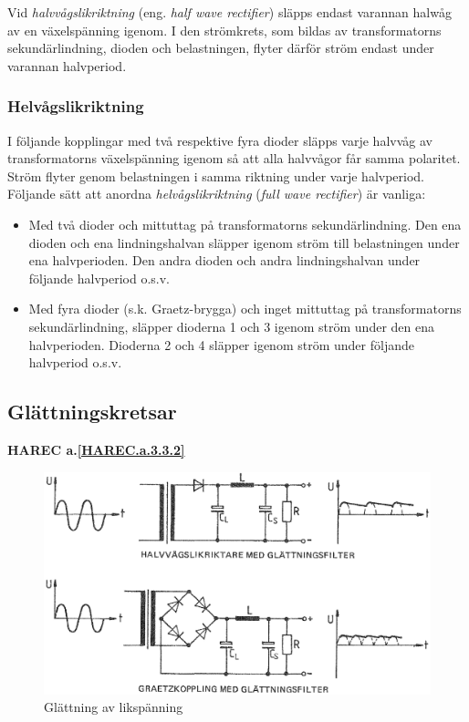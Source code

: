 Vid \emph{halvvågslikriktning} (eng. \emph{half wave rectifier}) släpps endast
varannan halwåg av en växelspänning igenom. I den strömkrets, som bildas av
transformatorns sekundärlindning, dioden och belastningen, flyter därför ström
endast under varannan halvperiod.

\subsubsection{Helvågslikriktning}

I följande kopplingar med två respektive fyra dioder släpps varje
halvvåg av transformatorns växelspänning igenom så att alla halvvågor
får samma polaritet. Ström flyter genom belastningen i samma riktning
under varje halvperiod. Följande sätt att anordna \emph{helvågslikriktning}
(\emph{full wave rectifier}) är vanliga:
\begin{itemize}
\item Med två dioder och mittuttag på transformatorns
  sekundärlindning. Den ena dioden och ena lindningshalvan släpper
  igenom ström till belastningen under ena halvperioden. Den andra
  dioden och andra lindningshalvan under följande halvperiod o.s.v.

\item Med fyra dioder (s.k. Graetz-brygga) och inget mittuttag på
  transformatorns sekundärlindning, släpper dioderna 1 och 3 igenom
  ström under den ena halvperioden.  Dioderna 2 och 4 släpper igenom
  ström under följande halvperiod o.s.v.
\end{itemize}

\subsection{Glättningskretsar}
\textbf{HAREC a.\ref{HAREC.a.3.3.2}\label{myHAREC.a.3.3.2}}

\begin{figure}
\includegraphics[width=\textwidth]{images/cropped_pdfs/bild_2_3-36.pdf}
\caption{Glättning av likspänning}
\label{fig:BildII3-36}
\end{figure}

